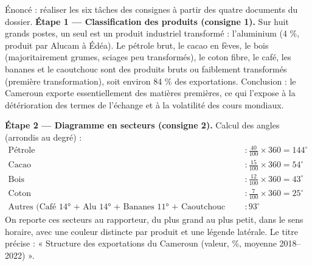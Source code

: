 \documentclass[11pt]{article}
\newcommand{\cle}[1]{{\popxbold\color{popdark}#1}}
\begin{document}
\begin{exoresolu}
Énoncé : réaliser les six tâches des consignes à partir des quatre documents du dossier.
\tcblower
\textbf{Étape 1 — Classification des produits (consigne 1).} Sur huit grands postes, un seul est un produit industriel transformé : l'aluminium (4 \%, produit par Alucam à Édéa). Le pétrole brut, le cacao en fèves, le bois (majoritairement grumes, sciages peu transformés), le coton fibre, le café, les bananes et le caoutchouc sont des produits \cle{bruts} ou faiblement transformés (première transformation), soit environ 84 \% des exportations. Conclusion : le Cameroun exporte essentiellement des matières premières, ce qui l'expose à la \cle{détérioration des termes de l'échange} et à la volatilité des cours mondiaux.

\textbf{Étape 2 — Diagramme en secteurs (consigne 2).} Calcul des angles (arrondis au degré) :
\begin{align*}
\text{Pétrole} &: \frac{40}{100}\times 360 = 144^{\circ} \\
\text{Cacao} &: \frac{15}{100}\times 360 = 54^{\circ} \\
\text{Bois} &: \frac{12}{100}\times 360 = 43^{\circ} \\
\text{Coton} &: \frac{7}{100}\times 360 = 25^{\circ} \\
\text{Autres (Café 14° + Alu 14° + Bananes 11° + Caoutchouc 11° + Autres 43°)} &: 93^{\circ}
\end{align*}
On reporte ces secteurs au rapporteur, du plus grand au plus petit, dans le sens horaire, avec une couleur distincte par produit et une légende latérale. Le titre précise : « Structure des exportations du Cameroun (valeur, \%, moyenne 2018--2022) ».


\end{exoresolu}
\end{document}
